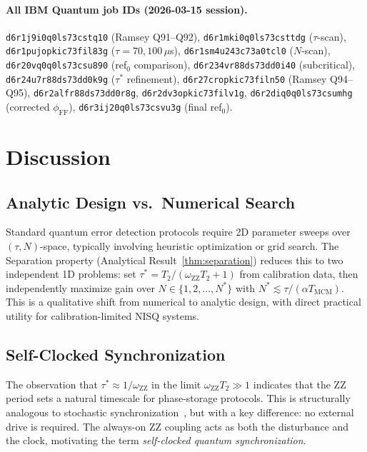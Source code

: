 \documentclass[10pt,twocolumn]{article}
\newcommand{\oZZ}{\omega_{\mathrm{ZZ}}}
\newcommand{\Tmc}{T_{\mathrm{MCM}}}
\newcommand{\taustar}{\tau^*}
\begin{document}
\paragraph{All IBM Quantum job IDs (2026-03-15 session).}
{\small\texttt{d6r1j9i0q0ls73cstq10} (Ramsey Q91--Q92),
\texttt{d6r1mki0q0ls73csttdg} ($\tau$-scan),
\texttt{d6r1pujopkic73fil83g} ($\tau=70,100\,\mu$s),
\texttt{d6r1sm4u243c73a0tcl0} ($N$-scan),
\texttt{d6r20vq0q0ls73csu890} (ref$_0$ comparison),
\texttt{d6r234vr88ds73dd0i40} (subcritical),
\texttt{d6r24u7r88ds73dd0k9g} ($\tau^*$ refinement),
\texttt{d6r27cropkic73filn50} (Ramsey Q94--Q95),
\texttt{d6r2alfr88ds73dd0r8g},
\texttt{d6r2dv3opkic73filv1g},
\texttt{d6r2diq0q0ls73csumhg} (corrected $\phi_\mathrm{FF}$),
\texttt{d6r3ij20q0ls73csvu3g} (final ref$_0$).}


\section{Discussion}

\subsection{Analytic Design vs.\ Numerical Search}

Standard quantum error detection protocols require 2D parameter sweeps
over $(\tau, N)$-space, typically involving heuristic optimization or
grid search.
The Separation property (Analytical Result~\ref{thm:separation}) reduces this to
two independent 1D problems:
set $\taustar = T_2/(\oZZ T_2+1)$ from calibration data,
then independently maximize gain over $N \in \{1, 2, \ldots, N^*\}$
with $N^* \lesssim \tau/(\alpha\Tmc)$.
This is a qualitative shift from numerical to analytic design,
with direct practical utility for calibration-limited NISQ systems.

\subsection{Self-Clocked Synchronization}

The observation that $\taustar \approx 1/\oZZ$ in the limit
$\oZZ T_2 \gg 1$ indicates that the ZZ period sets a natural timescale
for phase-storage protocols.
This is structurally analogous to stochastic synchronization~\cite{Pikovsky1997,Kuramoto1984},
but with a key difference: no external drive is required.
The always-on ZZ coupling acts as both the disturbance and the clock,
motivating the term \emph{self-clocked quantum synchronization}.
\end{document}
